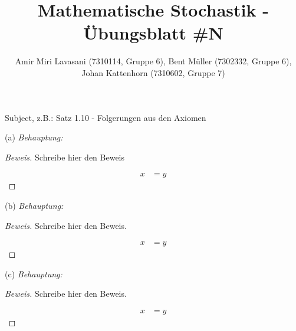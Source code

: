 \documentclass[10pt]{article}
\newenvironment{Aufgabe}[2][Aufgabe]{\begin{trivlist}
\item[\hskip \labelsep {\bfseries #1}\hskip \labelsep {\bfseries #2.}]}{\end{trivlist}}
\begin{document}
 
\title{ \textbf{Mathematische Stochastik - Übungsblatt \#N} }

\author{Amir Miri Lavasani (7310114, Gruppe 6), Bent Müller (7302332, Gruppe 6), \\ 
Johan Kattenhorn (7310602, Gruppe 7)} \maketitle

 
\begin{Aufgabe}{1}
Subject, z.B.: Satz 1.10 - Folgerungen aus den Axiomen
\end{Aufgabe}

(a) \textit{Behauptung: } 
\begin{proof}[Beweis]
Schreibe hier den Beweis

\begin{align*}
x &= y
\end{align*}

\end{proof}

(b) \textit{Behauptung: }
\begin{proof}[Beweis]
Schreibe hier den Beweis. 

\begin{align*}
x &= y
\end{align*}

\end{proof}

(c) \textit{Behauptung: }
\begin{proof}[Beweis]
Schreibe hier den Beweis. 

\begin{align*}
x &= y
\end{align*}

\end{proof}
\end{document}
